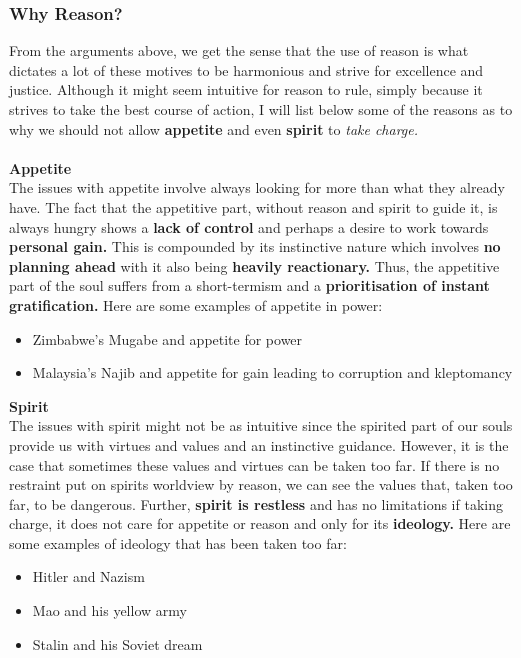\documentclass[12pt, letterpaper]{article}
\begin{document}
\subsubsection{Why Reason?}
From the arguments above, we get the sense that the use of reason is what dictates a lot of these motives to be harmonious and strive for excellence and justice. Although it might seem intuitive for reason to rule, simply because it strives to take the best course of action, I will list below some of the reasons as to why we should not allow \textbf{appetite} and even \textbf{spirit} to \textit{take charge.}\\\\
\textbf{Appetite}\\
The issues with appetite involve always looking for more than what they already have. The fact that the appetitive part, without reason and spirit to guide it, is always hungry shows a \textbf{lack of control} and perhaps a desire to work towards \textbf{personal gain.} This is compounded by its instinctive nature which involves \textbf{no planning ahead} with it also being \textbf{heavily reactionary.} Thus, the appetitive part of the soul suffers from a short-termism and a \textbf{prioritisation of instant gratification.} Here are some examples of appetite in power:
\begin{itemize}
	\item Zimbabwe's Mugabe and appetite for power
	\item Malaysia's Najib and appetite for gain leading to corruption and kleptomancy
\end{itemize}
\textbf{Spirit}\\
The issues with spirit might not be as intuitive since the spirited part of our souls provide us with virtues and values and an instinctive guidance. However, it is the case that sometimes these values and virtues can be taken too far. If there is no restraint put on spirits worldview by reason, we can see the values that, taken too far, to be dangerous. Further, \textbf{spirit is restless} and has no limitations if taking charge, it does not care for appetite or reason and only for its \textbf{ideology.} Here are some examples of ideology that has been taken too far:
\begin{itemize}
	\item Hitler and Nazism
	\item Mao and his yellow army
	\item Stalin and his Soviet dream
\end{itemize}
\end{document}
